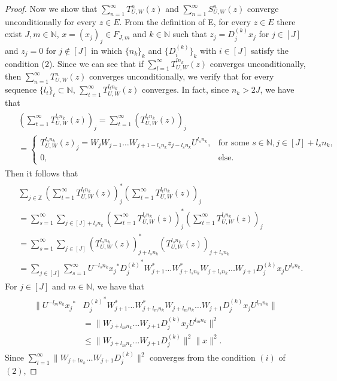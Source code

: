 \documentclass{article}
\begin{document}
\begin{proof}
Now we show that $\sum^{\infty}_{n=1} T^{n}_{U,W}(z)$ and $\sum^{\infty}_{n=1} S^{n}_{U,W}(z)$ converge unconditionally for every $z\in E$. From the definition of E, for every $z\in E$ there exist $J,m\in\mathbb{N}$, $x=(x_{j})_{j}\in F_{J,m}$ and $k\in \mathbb{N}$ such that $z_{j}=D^{(k)}_{j}x_{j}$ for $j\in [J]$ and $z_{j}=0$ for $j\notin [J]$ in which $\{n_{k}\}_{k}$ and $\{D^{(k)}_{i}\}_{k}$ with $i\in[J]$ satisfy the condition (2). Since we can see that if $\sum^{\infty}_{l=1}T^{ln_{k}}_{U,W}(z)$ converges unconditionally, then $\sum^{\infty}_{n=1} T^{n}_{U,W}(z)$ converges unconditionally, we verify that for every sequence $\{l_{t}\}_{t}\subset \mathbb{N}$, $\sum^{\infty}_{t=1}T^{l_{t}n_{k}}_{U,W}(z)$ converges.
In fact, since $n_{k}>2J$, we have that
\begin{eqnarray}\begin{split}\nonumber
&\left(\sum^{\infty}_{t=1}T^{l_{t}n_{k}}_{U,W}(z)\right)_{j}=\sum^{\infty}_{t=1}\left(T^{l_{t}n_{k}}_{U,W}(z)\right)_{j}\\
&=\left\{ \begin{array}{ll}
T^{l_{s}n_{k}}_{U,W}(z)_{j}=W_{j}W_{j-1}\ldots W_{j+1-l_{s}n_{k}}z_{j-l_{s}n_{k}}U^{l_{s}n_{k}}, & \textrm{for some } s\in \mathbb{N}, j\in [J]+l_{s}n_{k},\\
0, & \textrm{else}.
\end{array} \right.
\end{split}\end{eqnarray}
Then it follows that
\begin{eqnarray}\begin{split}\nonumber
&\sum_{j\in\mathbb{Z}}{\left(\sum^{\infty}_{t=1}T^{l_{t}n_{k}}_{U,W}(z)\right)}^{\ast}_{j}\left(\sum^{\infty}_{t=1}T^{l_{t}n_{k}}_{U,W}(z)\right)_{j}\\
&=\sum^{\infty}_{s=1}\sum_{j\in[J]+l_{s}n_{k}}\left(\sum^{\infty}_{t=1}T^{l_{t}n_{k}}_{U,W}(z)\right)^{\ast}_{j}\left(\sum^{\infty}_{t=1}
T^{l_{t}n_{k}}_{U,W}(z)\right)_{j}\\
&=\sum^{\infty}_{s=1}\sum_{j\in[J]}\left(T^{l_{s}n_{k}}_{U,W}(z)\right)^{\ast}_{j+l_{s}n_{k}}\left(T^{l_{s}n_{k}}_{U,W}(z)\right)_{j+l_{s}n_{k}}\\
&=\sum_{j\in[J]}\sum^{\infty}_{s=1}U^{-l_{s}n_{k}}{x_{j}}^{\ast}{D^{(k)}_{j}}^{\ast}{W^{\ast}_{j+1}}\ldots {W^{\ast}_{j+l_{s}n_{k}}}W_{j+l_{s}n_{k}}\ldots W_{j+1}D^{(k)}_{j}x_{j}U^{l_{s}n_{k}}.
\end{split}\end{eqnarray}
For $j\in[J]$ and $m\in\mathbb{N}$, we have that
\begin{eqnarray}\begin{split}\nonumber
 \|U^{-l_{m}n_{k}}{x_{j}}^{\ast}&{D^{(k)}_{j}}^{\ast}{W^{\ast}_{j+1}}\ldots {W^{\ast}_{j+l_{m}n_{k}}}W_{j+l_{m}n_{k}}\ldots W_{j+1}D^{(k)}_{j}x_{j}U^{l_{m}n_{k}}\|\\
 &=\|W_{j+l_{m}n_{k}}\ldots W_{j+1}D^{(k)}_{j}x_{j}U^{l_{m}n_{k}}\|^{2}\\
 &\leq \|W_{j+l_{m}n_{k}}\ldots W_{j+1}D^{(k)}_{j}\|^{2}\|x\|^{2}.
\end{split}\end{eqnarray}
  Since $\sum^{\infty}_{l=1}\|W_{j+ln_{k}}\ldots W_{j+1}D^{(k)}_{j}\|^{2}$ converges from the condition $(i)$ of $(2)$,


\end{proof}
\end{document}
